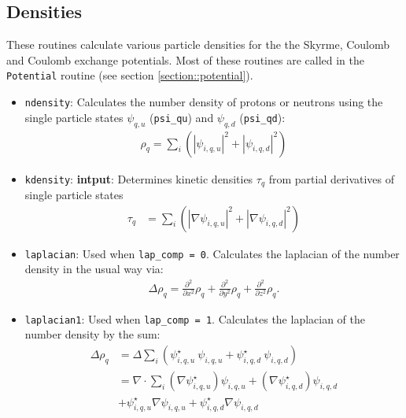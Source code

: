 \documentclass[3p]{elsarticle}
\begin{document}
\subsection{Densities}
\label{section::densities}
These routines calculate various particle densities for the the Skyrme, Coulomb and Coulomb exchange potentials. Most of these routines are called in the \texttt{Potential} routine (see section \ref{section::potential}).
\begin{itemize}
\item \texttt{ndensity}: Calculates the number density of protons or neutrons using the single particle states $\psi_{q,u}$ (\texttt{psi\_qu}) and $\psi_{q,d}$ (\texttt{psi\_qd}):
\begin{align}
\rho_q = \sum\nolimits_i \left( | \psi_{i,q,u} |^2 +  | \psi_{i,q,d} |^2 \right) 
\end{align}
\item \texttt{kdensity}: \textbf{intput}: Determines kinetic densities $\tau_q$ from partial derivatives of single particle states
\begin{align}
\tau_q &= \sum\nolimits_i \left( | \nabla \psi_{i,q,u} |^2  +  | \nabla \psi_{i,q,d} |^2 \right) 
\end{align}
\item \texttt{laplacian}: Used when \texttt{lap\_comp = 0}. Calculates the laplacian of the number density in the usual way via:
\begin{align}
\Delta \rho_q = \frac{\partial^2}{\partial x^2} \rho_q + \frac{\partial^2}{\partial y^2} \rho_q + \frac{\partial^2}{\partial z^2} \rho_q .  
\label{lap_simple}
\end{align}
\item \texttt{laplacian1}: Used when \texttt{lap\_comp = 1}. Calculates the laplacian of the number density by the sum:
\begin{align}
\Delta \rho_q &= \Delta \sum\nolimits_i \left( \psi^{\star}_{i,q,u} \: \psi_{i,q,u} +  \psi^{\star}_{i,q,d} \: \psi_{i,q,d} \right) \nonumber\\
                      &= \nabla \cdot \sum\nolimits_i  \left( \nabla  \psi^{\star}_{i,q,u} \right) \psi_{i,q,u} +  \left( \nabla  \psi^{\star}_{i,q,d} \right) \psi_{i,q,d}  \nonumber\\
                      &+ \psi^{\star}_{i,q,u} \nabla \psi_{i,q,u} +  \psi^{\star}_{i,q,d} \nabla  \psi_{i,q,d}

\end{align}
\end{itemize}
\end{document}
